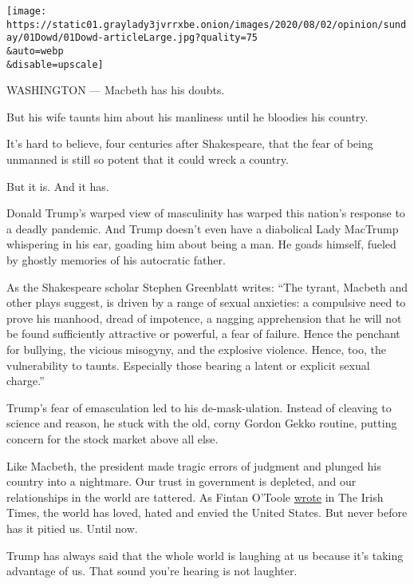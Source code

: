 \texttt{[image: https://static01.graylady3jvrrxbe.onion/images/2020/08/02/opinion/sunday/01Dowd/01Dowd-articleLarge.jpg?quality=75\\\&auto=webp\\\&disable=upscale]}

WASHINGTON --- Macbeth has his doubts.

But his wife taunts him about his manliness until he bloodies his
country.

It's hard to believe, four centuries after Shakespeare, that the fear of
being unmanned is still so potent that it could wreck a country.

But it is. And it has.

Donald Trump's warped view of masculinity has warped this nation's
response to a deadly pandemic. And Trump doesn't even have a diabolical
Lady MacTrump whispering in his ear, goading him about being a man. He
goads himself, fueled by ghostly memories of his autocratic father.

As the Shakespeare scholar Stephen Greenblatt writes: ``The tyrant,
Macbeth and other plays suggest, is driven by a range of sexual
anxieties: a compulsive need to prove his manhood, dread of impotence, a
nagging apprehension that he will not be found sufficiently attractive
or powerful, a fear of failure. Hence the penchant for bullying, the
vicious misogyny, and the explosive violence. Hence, too, the
vulnerability to taunts. Especially those bearing a latent or explicit
sexual charge.''

Trump's fear of emasculation led to his de-mask-ulation. Instead of
cleaving to science and reason, he stuck with the old, corny Gordon
Gekko routine, putting concern for the stock market above all else.

Like Macbeth, the president made tragic errors of judgment and plunged
his country into a nightmare. Our trust in government is depleted, and
our relationships in the world are tattered. As Fintan O'Toole
\href{https://www.irishtimes.com/opinion/fintan-o-toole-donald-trump-has-destroyed-the-country-he-promised-to-make-great-again-1.4235928?mode=sample\&auth-failed=1\&pw-origin=https\%3A\%2F\%2Fwww.irishtimes.com\%2Fopinion\%2Ffintan-o-toole-donald-trump-has-destroyed-the-country-he-promised-to-make-great-again-1.4235928}{wrote}
in The Irish Times, the world has loved, hated and envied the United
States. But never before has it pitied us. Until now.

Trump has always said that the whole world is laughing at us because
it's taking advantage of us. That sound you're hearing is not laughter.


